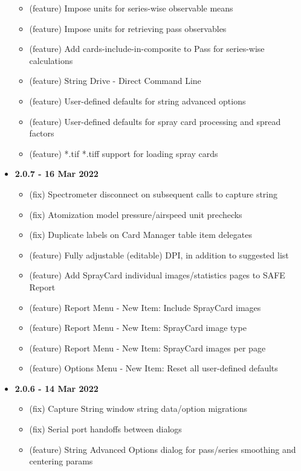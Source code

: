 \documentclass[10pt,letterpaper,titlepage]{article}
\begin{document}
\begin{itemize}
\begin{itemize}
            \item (feature) Impose units for series-wise observable means
            \item (feature) Impose units for retrieving pass observables
            \item (feature) Add cards-include-in-composite to Pass for series-wise calculations
            \item (feature) String Drive - Direct Command Line
            \item (feature) User-defined defaults for string advanced options
            \item (feature) User-defined defaults for spray card processing and spread factors
            \item (feature) *.tif *.tiff support for loading spray cards
        \end{itemize}
        \item \textbf{2.0.7 - 16 Mar 2022}
        \begin{itemize}
            \item (fix) Spectrometer disconnect on subsequent calls to capture string
            \item (fix) Atomization model pressure/airspeed unit prechecks
            \item (fix) Duplicate labels on Card Manager table item delegates
            \item (feature) Fully adjustable (editable) DPI, in addition to suggested list
            \item (feature) Add SprayCard individual images/statistics pages to SAFE Report
            \item (feature) Report Menu - New Item: Include SprayCard images
            \item (feature) Report Menu - New Item: SprayCard image type
            \item (feature) Report Menu - New Item: SprayCard images per page
            \item (feature) Options Menu - New Item: Reset all user-defined defaults
        \end{itemize}
        \item \textbf{2.0.6 - 14 Mar 2022}
        \begin{itemize}
            \item (fix) Capture String window string data/option migrations
            \item (fix) Serial port handoffs between dialogs
            \item (feature) String Advanced Options dialog for pass/series smoothing and centering params

\end{itemize}
\end{itemize}
\end{document}
